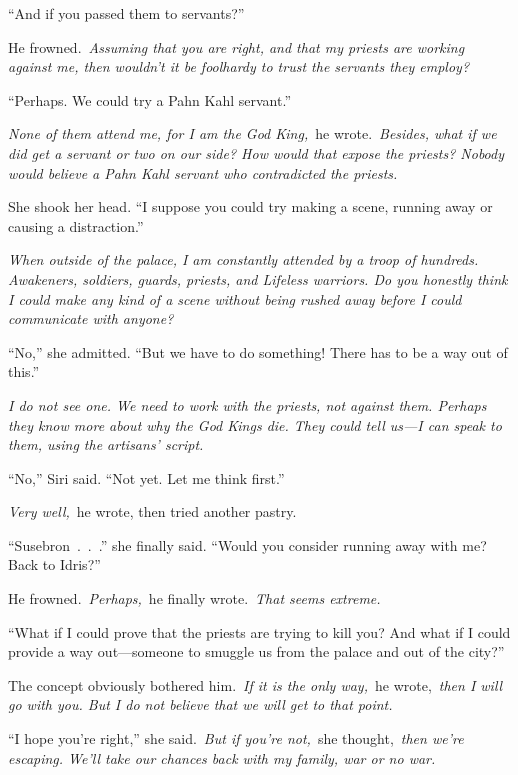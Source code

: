 “And if you passed them to servants?”

He frowned.~\textit{Assuming that you are right, and that my priests are working against me, then wouldn’t it be foolhardy to trust the servants they employ?}

“Perhaps. We could try a Pahn Kahl servant.”

\textit{None of them attend me, for I am the God King,}~he wrote.~\textit{Besides, what if we did get a servant or two on our side? How would that expose the priests? Nobody would believe a Pahn Kahl servant who contradicted the priests.}

She shook her head. “I suppose you could try making a scene, running away or causing a distraction.”

\textit{When outside of the palace, I am constantly attended by a troop of hundreds. Awakeners, soldiers, guards, priests, and Lifeless warriors. Do you honestly think I could make any kind of a scene without being rushed away before I could communicate with anyone?}

“No,” she admitted. “But we have to do something! There has to be a way out of this.”

\textit{I do not see one. We need to work with the priests, not against them. Perhaps they know more about why the God Kings die. They could tell us—I can speak to them, using the artisans’ script.}

“No,” Siri said. “Not yet. Let me think first.”

\textit{Very well,}~he wrote, then tried another pastry.

“Susebron~.~.~.” she finally said. “Would you consider running away with me? Back to Idris?”

He frowned.~\textit{Perhaps,}~he finally wrote.~\textit{That seems extreme.}

“What if I could prove that the priests are trying to kill you? And what if I could provide a way out—someone to smuggle us from the palace and out of the city?”

The concept obviously bothered him.~\textit{If it is the only way,}~he wrote,~\textit{then I will go with you. But I do not believe that we will get to that point.}

“I hope you’re right,” she said.~\textit{But if you’re not,}~she thought,~\textit{then we’re escaping. We’ll take our chances back with my family, war or no war.}

